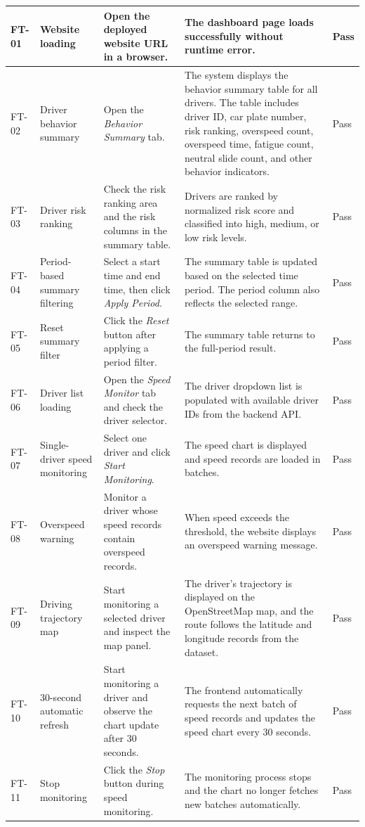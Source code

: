 \documentclass[12pt,a4paper]{article}
\begin{document}
\begin{small}
\begin{longtable}{|p{1.2cm}|p{3.2cm}|p{5.0cm}|p{5.0cm}|p{1.5cm}|}
FT-01 & Website loading & Open the deployed website URL in a browser. & The dashboard page loads successfully without runtime error. & Pass \\
\hline
FT-02 & Driver behavior summary & Open the \textit{Behavior Summary} tab. & The system displays the behavior summary table for all drivers. The table includes driver ID, car plate number, risk ranking, overspeed count, overspeed time, fatigue count, neutral slide count, and other behavior indicators. & Pass \\
\hline
FT-03 & Driver risk ranking & Check the risk ranking area and the risk columns in the summary table. & Drivers are ranked by normalized risk score and classified into high, medium, or low risk levels. & Pass \\
\hline
FT-04 & Period-based summary filtering & Select a start time and end time, then click \textit{Apply Period}. & The summary table is updated based on the selected time period. The period column also reflects the selected range. & Pass \\
\hline
FT-05 & Reset summary filter & Click the \textit{Reset} button after applying a period filter. & The summary table returns to the full-period result. & Pass \\
\hline
FT-06 & Driver list loading & Open the \textit{Speed Monitor} tab and check the driver selector. & The driver dropdown list is populated with available driver IDs from the backend API. & Pass \\
\hline
FT-07 & Single-driver speed monitoring & Select one driver and click \textit{Start Monitoring}. & The speed chart is displayed and speed records are loaded in batches. & Pass \\
\hline
FT-08 & Overspeed warning & Monitor a driver whose speed records contain overspeed records. & When speed exceeds the threshold, the website displays an overspeed warning message. & Pass \\
\hline
FT-09 & Driving trajectory map & Start monitoring a selected driver and inspect the map panel. & The driver's trajectory is displayed on the OpenStreetMap map, and the route follows the latitude and longitude records from the dataset. & Pass \\
\hline
FT-10 & 30-second automatic refresh & Start monitoring a driver and observe the chart update after 30 seconds. & The frontend automatically requests the next batch of speed records and updates the speed chart every 30 seconds. & Pass \\
\hline
FT-11 & Stop monitoring & Click the \textit{Stop} button during speed monitoring. & The monitoring process stops and the chart no longer fetches new batches automatically. & Pass \\

\end{longtable}
\end{small}
\end{document}
